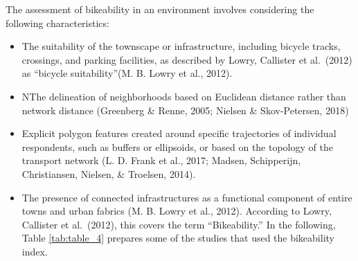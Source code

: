 \documentclass[12pt,twoside]{reedthesis}
\begin{document}
The assessment of bikeability in an environment involves considering the following characteristics:
\begin{itemize}
\item
  The suitability of the townscape or infrastructure, including bicycle tracks, crossings, and parking facilities, as described by Lowry, Callister et al.~(2012) as ``bicycle suitability''(M. B. Lowry et al., 2012).
\item
  NThe delineation of neighborhoods based on Euclidean distance rather than network distance (Greenberg \& Renne, 2005; Nielsen \& Skov-Petersen, 2018)
\item
  Explicit polygon features created around specific trajectories of individual respondents, such as buffers or ellipsoids, or based on the topology of the transport network (L. D. Frank et al., 2017; Madsen, Schipperijn, Christiansen, Nielsen, \& Troelsen, 2014).
\item
  The presence of connected infrastructures as a functional component of entire towns and urban fabrics (M. B. Lowry et al., 2012). According to Lowry, Callister et al.~(2012), this covers the term ``Bikeability.'' In the following, Table \ref{tab:table_4} prepares some of the studies that used the bikeability index.
\end{itemize}
\end{document}
